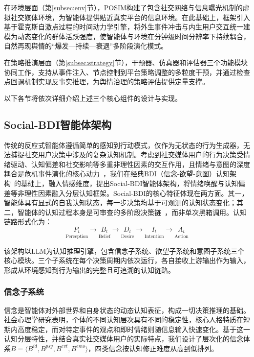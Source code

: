 \documentclass[a4paper,fleqn]{cas-dc}
\begin{document}
在环境层面（第\ref{subsec:env}节），POSIM构建了包含社交网络与信息曝光机制的虚拟社交媒体环境，为智能体提供贴近真实平台的信息环境。在此基础上，框架引入基于霍克斯自激点过程的时间动力学引擎，将外生事件冲击与内生用户交互统一建模为动态变化的群体活跃强度，使智能体与环境在分钟级时间分辨率下持续耦合，自然再现舆情的“爆发—持续—衰退”多阶段演化模式。

在策略推演层面（第\ref{subsec:strategy}节），干预器、仿真器和评估器三个功能模块协同工作，支持从事件注入、节点控制到平台策略调整的多粒度干预，并通过检查点回调机制实现反事实推理，为舆情治理的策略评估提供定量支撑。

以下各节将依次详细介绍上述三个核心组件的设计与实现。



\subsection{Social-BDI智能体架构}\label{subsec:agent}

传统的反应式智能体遵循简单的感知到行动模式，仅作为无状态的行为生成器，无法捕捉社交用户决策中涉及的复杂认知机制。考虑到社交媒体用户的行为决策受情绪驱动、认知偏差和社交影响等多重非理性因素的交互作用，且情绪与意图的深度耦合是危机事件演化的核心动力~\citep{myint2024crisis_mtl_intent}，我们在经典BDI（信念-欲望-意图）认知架构~\citep{bratman_intention_1987,rao_bdi_1995}的基础上，融入情感维度，提出Social-BDI智能体架构，将情绪唤醒与认知偏差等非理性因素融入分层认知框架。Social-BDI的核心特征体现在两方面。其一，智能体具有显式的自我认知状态，每一步决策均基于可观测的认知状态变化；其二，智能体的认知过程本身是可审查的多阶段决策链~\citep{wei_chain_2022}，而非单次黑箱调用。认知链路形式化为：
\begin{equation}
\underset{\text{Perception}}{P_t} \longrightarrow \underset{\text{Belief}}{B_t} \longrightarrow \underset{\text{Desire}}{D_t} \longrightarrow \underset{\text{Intention}}{I_t} \longrightarrow \underset{\text{Action}}{A_t}
\end{equation}

该架构以LLM为认知推理引擎，包含信念子系统、欲望子系统和意图子系统三个核心模块。三个子系统在每个决策周期内依次运行，各自接收上游输出作为输入，形成从环境感知到行为输出的完整且可追溯的认知链路。

\subsubsection{信念子系统}

信念是智能体对外部世界和自身状态的动态认知表征，构成一切决策推理的基础。社会心理学研究表明，个体的不同认知层次具有不同的稳定性，核心人格特质在短期内高度稳定，而对特定事件的观点和即时情绪则随信息输入快速变化。基于这一认知分层特性，并结合真实社交媒体用户的实际特点，我们设计了层次化的信念体系$B = \langle B^{id}, B^{psy}, B^{evt}, B^{emo} \rangle$，四类信念按认知修正难度从高到低排列。
\end{document}
